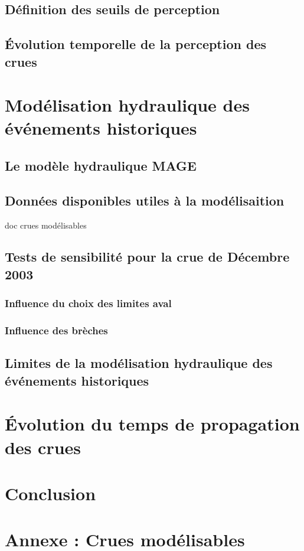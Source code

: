 \documentclass[11pt]{article}
\begin{document}
\FloatBarrier
	\subsection{Définition des seuils de perception}
	
	\subsection{Évolution temporelle de la perception des crues}

\section{Modélisation hydraulique des événements historiques}

	\subsection{Le modèle hydraulique MAGE}
	
	\subsection{Données disponibles utiles à la modélisaition}
	doc crues modélisables
	
	\subsection{Tests de sensibilité pour la crue de Décembre 2003}
		\subsubsection{Influence du choix des limites aval}
		
		\subsubsection{Influence des brèches}
	
	\subsection{Limites de la modélisation hydraulique des événements historiques}

\section{Évolution du temps de propagation des crues}

\section{Conclusion}

\section{Annexe : Crues modélisables}



\printbibliography
\end{document}

